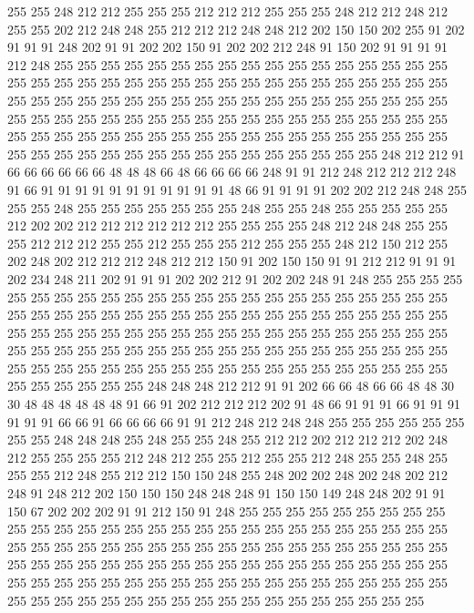 255 255 248 212 212 255 255 255 212 212 212 255 255 255 248 212 212 248 212 255
255 202 212 248 248 255 212 212 212 248 248 212 202 150 150 202 255 91 202 91
91 91 248 202 91 91 202 202 150 91 202 202 212 248 91 150 202 91 91 91
91 212 248 255 255 255 255 255 255 255 255 255 255 255 255 255 255 255 255 255
255 255 255 255 255 255 255 255 255 255 255 255 255 255 255 255 255 255 255 255
255 255 255 255 255 255 255 255 255 255 255 255 255 255 255 255 255 255 255 255
255 255 255 255 255 255 255 255 255 255 255 255 255 255 255 255 255 255 255 255
255 255 255 255 255 255 255 255 255 255 255 255 255 255 255 255 255 255 255 255
255 255 255 255 255 255 255 255 255 255 255 255 248 212 212 91 66 66 66 66
66 66 48 48 48 66 48 66 66 66 66 248 91 91 212 248 212 212 212 248
91 66 91 91 91 91 91 91 91 91 91 91 91 48 66 91 91 91 91 202
202 212 248 248 255 255 255 248 255 255 255 255 255 255 255 248 255 255 248 255
255 255 255 255 212 202 202 212 212 212 212 212 212 255 255 255 255 248 212 248
248 255 255 255 212 212 212 255 255 212 255 255 255 212 255 255 255 248 212 150
212 255 202 248 202 212 212 212 248 212 212 150 91 202 150 150 91 91 212 212
91 91 91 202 234 248 211 202 91 91 91 202 202 212 91 202 202 248 91 248
255 255 255 255 255 255 255 255 255 255 255 255 255 255 255 255 255 255 255 255
255 255 255 255 255 255 255 255 255 255 255 255 255 255 255 255 255 255 255 255
255 255 255 255 255 255 255 255 255 255 255 255 255 255 255 255 255 255 255 255
255 255 255 255 255 255 255 255 255 255 255 255 255 255 255 255 255 255 255 255
255 255 255 255 255 255 255 255 255 255 255 255 255 255 255 255 255 255 255 255
255 255 255 255 255 248 248 248 212 212 91 91 202 66 66 48 66 66 48 48
30 30 48 48 48 48 48 48 91 66 91 202 212 212 212 202 91 48 66 91
91 91 66 91 91 91 91 91 91 66 66 91 66 66 66 66 91 91 212 248
212 248 248 255 255 255 255 255 255 255 255 248 248 248 255 248 255 255 248 255
212 212 202 212 212 212 202 248 212 255 255 255 255 212 248 212 255 255 212 255
255 212 248 255 255 248 255 255 255 212 248 255 212 212 150 150 248 255 248 202
202 248 202 248 202 212 248 91 248 212 202 150 150 150 248 248 248 91 150 150
149 248 248 202 91 91 150 67 202 202 202 91 91 212 150 91 248 255 255 255
255 255 255 255 255 255 255 255 255 255 255 255 255 255 255 255 255 255 255 255
255 255 255 255 255 255 255 255 255 255 255 255 255 255 255 255 255 255 255 255
255 255 255 255 255 255 255 255 255 255 255 255 255 255 255 255 255 255 255 255
255 255 255 255 255 255 255 255 255 255 255 255 255 255 255 255 255 255 255 255
255 255 255 255 255 255 255 255 255 255 255 255 255 255 255 255 255 255 255 255
